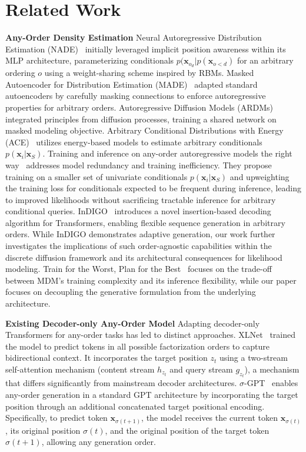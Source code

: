 \section{Related Work}
\label{sec:related work}
\textbf{Any-Order Density Estimation}
Neural Autoregressive Distribution Estimation (NADE)~\cite{uria2016neural} initially leveraged implicit position awareness within its MLP architecture, parameterizing conditionals $p(\boldsymbol{x}_{o_d} | p(\boldsymbol{x}_{o<d})$ for an arbitrary ordering $o$ using a weight-sharing scheme inspired by RBMs. Masked Autoencoder for Distribution Estimation (MADE)~\cite{germain2015made} adapted standard autoencoders by carefully masking connections to enforce autoregressive properties for arbitrary orders. Autoregressive Diffusion Models (ARDMs)~\cite{hoogeboom2021autoregressive} integrated principles from diffusion processes, training a shared network on masked modeling objective. Arbitrary Conditional Distributions with Energy (ACE)~\cite{strauss2021arbitrary} utilizes energy-based models to estimate arbitrary conditionals $p(\boldsymbol{x}_i | \boldsymbol{x}_S)$. Training and inference on any-order autoregressive models the right way~\cite{shih2022training} addresses model redundancy and training inefficiency. They propose training on a smaller set of univariate conditionals $p(\boldsymbol{x}_i | \boldsymbol{x}_S)$ and upweighting the training loss for conditionals expected to be frequent during inference, leading to improved likelihoods without sacrificing tractable inference for arbitrary conditional queries.  InDIGO~\cite{gu2019insertion} introduces a novel insertion-based decoding algorithm for Transformers, enabling flexible sequence generation in arbitrary orders. While InDIGO demonstrates adaptive generation, our work further investigates the implications of such order-agnostic capabilities within the discrete diffusion framework and its architectural consequences for likelihood modeling. Train for the Worst, Plan for the Best~\cite{kim2025train} focuses on the trade-off between MDM's training complexity and its inference flexibility, while our paper focuses on decoupling the generative formulation from the underlying architecture.

\textbf{Existing Decoder-only Any-Order Model} Adapting decoder-only Transformers for any-order tasks has led to distinct approaches. XLNet~\cite{yang2019xlnet} trained the model to predict tokens in all possible factorization orders to capture bidirectional context. It incorporates the target position $z_t$ using a two-stream self-attention mechanism (content stream $h_{z_t}$ and query stream $g_{z_t}$), a mechanism that differs significantly from mainstream decoder architectures. $\sigma$-GPT~\cite{pannatier2024sigma} enables any-order generation in a standard GPT architecture by incorporating the target position through an additional concatenated target positional encoding. Specifically, to predict token $\boldsymbol{x}_{\sigma(t+1)}$, the model receives the current token $\boldsymbol{x}_{\sigma(t)}$, its original position $\sigma(t)$, and the original position of the target token $\sigma(t+1)$, allowing any generation order.

